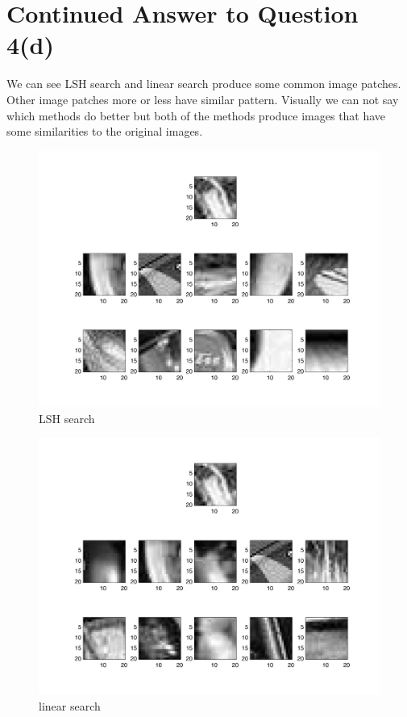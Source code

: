 \documentclass[11pt]{article}
\begin{document}
\pagebreak[4]
\section*{Continued Answer to Question 4(d)}
We can see LSH search and linear search produce some common image patches.
Other image patches more or less have similar pattern.
Visually we can not say which methods do better
but both of the methods produce images that have some similarities to the original images.
\begin{figure}[h]
\center
\includegraphics[scale=0.45]{LSH_negihbor.png}
\caption{LSH search}
\end{figure}

\begin{figure}[h]
\center
\includegraphics[scale=0.45]{linear_negihbor.png}
\caption{linear search}
\end{figure}
\end{document}
